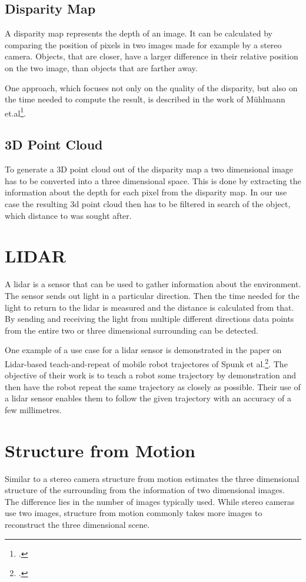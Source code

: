 \subsection{Disparity Map}
A disparity map represents the depth of an image. It can be calculated by comparing the position of pixels in two images made for example by a stereo camera. Objects, that are closer, have a larger difference in their relative position on the two image, than objects that are farther away.

One approach, which focuses not only on the quality of the disparity, but also on the time needed to compute the result, is described in the work of Mühlmann et.al\footcite{Muehlmann_Calculating_Dense_Disparity_Maps_from_Color_Stereo_Images}.

\subsection{3D Point Cloud}
To generate a 3D point cloud out of the disparity map a two dimensional image has to be converted into a three dimensional space. This is done by extracting the information about the depth for each pixel from the disparity map. In our use case the resulting 3d point cloud then has to be filtered in search of the object, which distance to was sought after.

\section{LIDAR}
A lidar is a sensor that can be used to gather information about the environment. The sensor sends out light in a particular direction. Then the time needed for the light to return to the lidar is measured and the distance is calculated from that. By sending and receiving the light from multiple different directions data points from the entire two or three dimensional surrounding can be detected.

One example of a use case for a lidar sensor is demonstrated in the paper on Lidar-based teach-and-repeat of mobile robot trajectores of Spunk et al.\footcite{Sprunk_Lidar-based_teach-and-repeat_of_mobile_robot_trajectories}. The objective of their work is to teach a robot some trajectory by demonstration and then have the robot repeat the same trajectory as closely as possible. Their use of a lidar sensor enables them to follow the given trajectory with an accuracy of a few millimetres.

\section{Structure from Motion}
Similar to a stereo camera structure from motion estimates the three dimensional structure of the surrounding from the information of two dimensional images. The difference lies in the number of images typically used. While stereo cameras use two images, structure from motion commonly takes more images to reconstruct the three dimensional scene.

